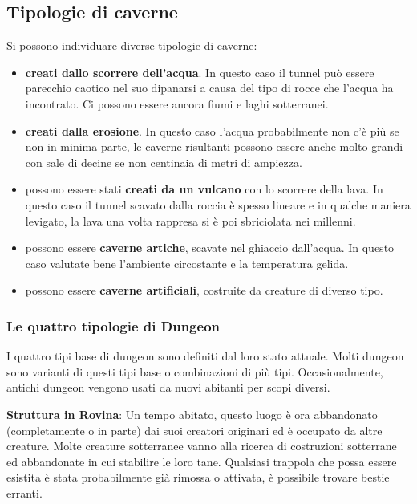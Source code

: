 \begin{multicols}{2}
\subsection{Tipologie di caverne}

Si possono individuare diverse tipologie di caverne:

\begin{itemize}[leftmargin=*] \setlength{\itemsep}{0pt}


\item \textbf{creati dallo scorrere dell'acqua}. In questo caso il tunnel può essere parecchio caotico nel suo dipanarsi a causa del tipo di rocce che l'acqua ha incontrato. Ci possono essere ancora fiumi e laghi sotterranei.

\item \textbf{creati dalla erosione}. In questo caso l'acqua probabilmente non c'è più se non in minima parte, le caverne risultanti possono essere anche molto grandi con sale di decine se non centinaia di metri di ampiezza.

\item possono essere stati \textbf{creati da un vulcano} con lo scorrere della lava. In questo caso il tunnel scavato dalla roccia è spesso lineare e in qualche maniera levigato, la lava una volta rappresa si è poi sbriciolata nei millenni.

\item possono essere \textbf{caverne artiche}, scavate nel ghiaccio dall'acqua. In questo caso valutate bene l'ambiente circostante e la temperatura gelida.

\item possono essere \textbf{caverne artificiali}, costruite da creature di diverso tipo.

\end{itemize}

\subsubsection{Le quattro tipologie di Dungeon}

I quattro tipi base di dungeon sono definiti dal loro stato attuale. Molti dungeon sono varianti di questi tipi base o combinazioni di più tipi. Occasionalmente, antichi dungeon vengono usati da nuovi abitanti per scopi diversi.

\textbf{Struttura in Rovina}: Un tempo abitato, questo luogo è ora abbandonato (completamente o in parte) dai suoi creatori originari ed è occupato da altre creature. Molte creature sotterranee vanno alla ricerca di costruzioni sotterrane ed abbandonate in cui stabilire le loro tane. Qualsiasi trappola che possa essere esistita è stata probabilmente già rimossa o attivata, è possibile trovare bestie erranti.


\end{multicols}
